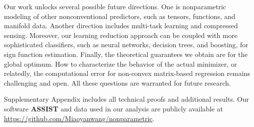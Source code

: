\documentclass[aos]{imsart}
\theoremstyle{definition}
\begin{document}
Our work unlocks several possible future directions. One is nonparametric modeling of other nonconventional predictors, such as tensors, functions, and manifold data. Another direction includes multi-task learning and compressed sensing. Moreover, our learning reduction approach can be coupled with more sophisticated classifiers, such as neural networks, decision trees, and boosting, for sign function estimation. Finally, the theoretical guarantees we obtain are for the global optimum. How to characterize the behavior of the actual minimizer, or relatedly, the computational error for non-convex matrix-based regression remains challenging and open. All these questions are warranted for future research. 










\begin{supplement}
Supplementary Appendix includes all technical proofs and additional results. Our software {\bf \footnotesize ASSIST} and data used in our analysis are publicly available at \url{https://github.com/Miaoyanwang/nonparametric}.
\end{supplement}





 
       
\end{document}

